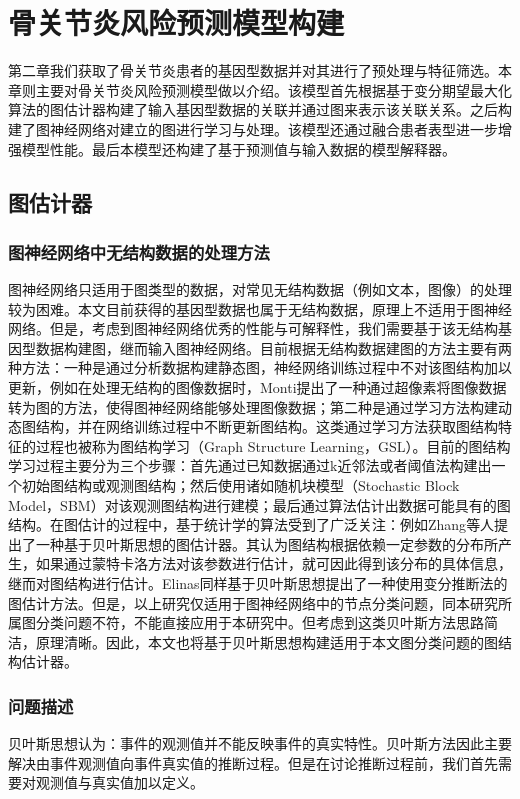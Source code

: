 \chapter{骨关节炎风险预测模型构建}
第二章我们获取了骨关节炎患者的基因型数据并对其进行了预处理与特征筛选。本章则主要对骨关节炎风险预测模型做以介绍。该模型首先根据基于变分期望最大化算法的图估计器构建了输入基因型数据的关联并通过图来表示该关联关系。之后构建了图神经网络对建立的图进行学习与处理。该模型还通过融合患者表型进一步增强模型性能。最后本模型还构建了基于预测值与输入数据的模型解释器。
\section{图估计器}
\subsection{图神经网络中无结构数据的处理方法}
图神经网络只适用于图类型的数据，对常见无结构数据（例如文本，图像）的处理较为困难。本文目前获得的基因型数据也属于无结构数据，原理上不适用于图神经网络。但是，考虑到图神经网络优秀的性能与可解释性，我们需要基于该无结构基因型数据构建图，继而输入图神经网络。目前根据无结构数据建图的方法主要有两种方法：一种是通过分析数据构建静态图，神经网络训练过程中不对该图结构加以更新\cite{hu_embedding_2017,monti_geometric_2016}，例如在处理无结构的图像数据时，Monti\cite{monti_geometric_2016}提出了一种通过超像素将图像数据转为图的方法，使得图神经网络能够处理图像数据；第二种是通过学习方法构建动态图结构，并在网络训练过程中不断更新图结构\cite{zhu_survey_2022}。这类通过学习方法获取图结构特征的过程也被称为图结构学习（Graph Structure Learning，GSL）。目前的图结构学习过程主要分为三个步骤：首先通过已知数据通过k近邻法\cite{preparata_computational_1985}或者阈值法\cite{bentley_complexity_1977}构建出一个初始图结构或观测图结构；然后使用诸如随机块模型（Stochastic Block Model，SBM）\cite{holland_stochastic_1983}对该观测图结构进行建模；最后通过算法估计出数据可能具有的图结构。在图估计的过程中，基于统计学的算法受到了广泛关注：例如Zhang\cite{zhang_bayesian_2019}等人提出了一种基于贝叶斯思想的图估计器。其认为图结构根据依赖一定参数的分布所产生，如果通过蒙特卡洛方法对该参数进行估计，就可因此得到该分布的具体信息，继而对图结构进行估计。Elinas\cite{elinas_variational_2020}同样基于贝叶斯思想提出了一种使用变分推断法的图估计方法。但是，以上研究仅适用于图神经网络中的节点分类问题，同本研究所属图分类问题不符，不能直接应用于本研究中。但考虑到这类贝叶斯方法思路简洁，原理清晰。因此，本文也将基于贝叶斯思想构建适用于本文图分类问题的图结构估计器。
\subsection{问题描述}
贝叶斯思想认为：事件的观测值并不能反映事件的真实特性。贝叶斯方法因此主要解决由事件观测值向事件真实值的推断过程。但是在讨论推断过程前，我们首先需要对观测值与真实值加以定义。
